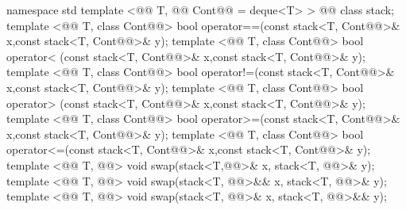 \documentclass[american,twoside]{book}
\begin{document}
\begin{codeblock} 
namespace std {
  template <@@ T, @@ Cont@@ = deque<T> > 
    @@
    class stack;
  template <@@ T, class Cont@@>
    bool operator==(const stack<T, Cont@@>& x,const stack<T, Cont@@>& y);
  template <@@ T, class Cont@@>
    bool operator< (const stack<T, Cont@@>& x,const stack<T, Cont@@>& y);
  template <@@ T, class Cont@@>
    bool operator!=(const stack<T, Cont@@>& x,const stack<T, Cont@@>& y);
  template <@@ T, class Cont@@>
    bool operator> (const stack<T, Cont@@>& x,const stack<T, Cont@@>& y);
  template <@@ T, class Cont@@>
    bool operator>=(const stack<T, Cont@@>& x,const stack<T, Cont@@>& y);
  template <@@ T, class Cont@@>
    bool operator<=(const stack<T, Cont@@>& x,const stack<T, Cont@@>& y);
  template <@@ T, @@>
    void swap(stack<T,@@>& x, stack<T, @@>& y);
  template <@@ T, @@>
    void swap(stack<T, @@>&& x, stack<T, @@>& y);
  template <@@ T, @@>
    void swap(stack<T, @@>& x, stack<T, @@>&& y);
}
\end{codeblock}

%
\end{document}
